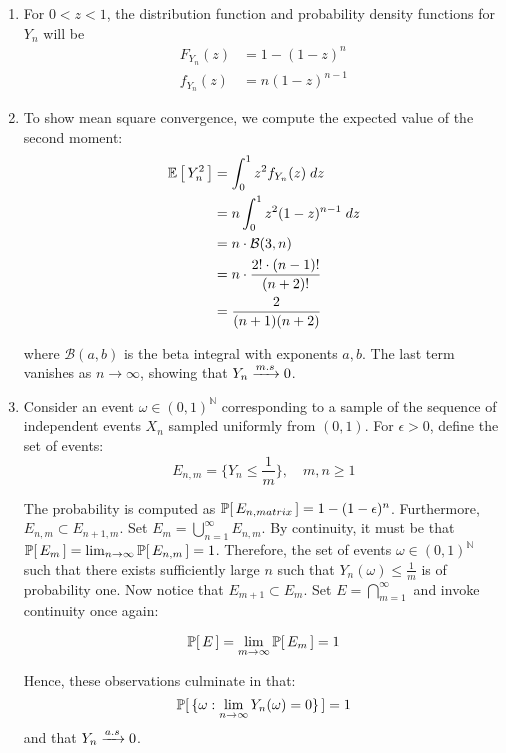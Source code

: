 \documentclass[12pt]{article}%
\begin{document}
\begin{enumerate}
  \item For $0 < z < 1$, the distribution function and probability density functions for $Y_n$ will be
  \begin{align*}
      F_{Y_n}(z) & = 1 - (1-z)^n \\
      f_{Y_n}(z) & = n(1-z)^{n-1}
  \end{align*}

  \item
  To show mean square convergence, we compute the expected value of the second moment:
  \begin{align*}
      \mathbb{E}\left[\,Y_n^2\,\right] & = \int_0^1 z^2 f_{Y_n}(z) \; dz \\
      & = n \int_0^1 z^2(1-z)^{n-1} \; dz \\
      & = n \cdot \mathcal{B}(3,n) \\
      & = n \cdot \frac{2!\cdot(n-1)!}{(n+2)!} \\
      & = \frac{2}{(n+1)(n+2)}
  \end{align*}

  where $\mathcal{B}(a,b)$ is the beta integral with exponents $a,b$. The last term vanishes as $n \rightarrow \infty$, showing that $Y_n \xrightarrow[]{m.s} 0$.

  \item
  Consider an event $\omega \in (0,1)^\mathbb{N}$ corresponding to a sample of the sequence of independent events $X_n$ sampled uniformly from $(0,1)$. For $\epsilon > 0$, define the set of events:
  \[ E_{n,m} = \{Y_n \leq \frac{1}{m}\}, \quad m, n \geq 1 \]

  The probability is computed as $\mathbb{P}[\,E_{n,matrix}\,] = 1 - (1 - \epsilon)^n$. Furthermore, $E_{n,m} \subset E_{n+1,m}$. Set $E_m = \bigcup_{n=1}^\infty E_{n,m}$. By continuity, it must be that $\mathbb{P}[\,E_m\,] = \lim_{n \rightarrow \infty} \mathbb{P}[\,E_{n,m}\,] = 1$. Therefore, the set of events $\omega\in (0,1)^\mathbb{N}$ such that there exists sufficiently large $n$ such that $Y_n(\omega) \leq \frac{1}{m}$ is of probability one. Now notice that $E_{m+1} \subset E_m$. Set $E = \bigcap_{m=1}^\infty$ and invoke continuity once again:

  \[\mathbb{P}[\,E\,] = \lim_{m \rightarrow \infty} \mathbb{P}[\,E_m\,] = 1 \]

Hence, these observations culminate in that:
    \[\mathbb{P}[\,\{\omega:\lim_{n \rightarrow \infty} Y_n(\omega) = 0\}\,] = 1 \] and that $Y_n \xrightarrow[]{a.s} 0$.
\end{enumerate}
\end{document}
